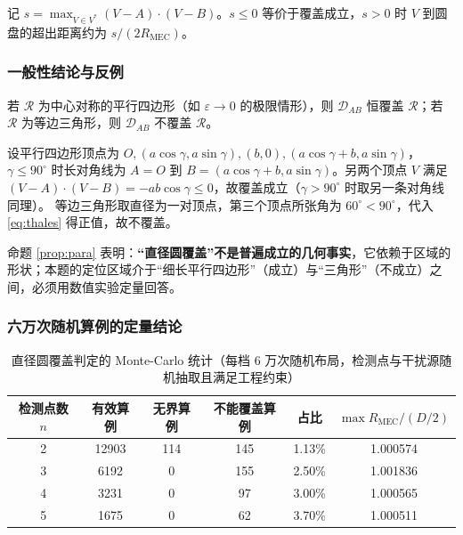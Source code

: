 记 $s=\max_{V\in V^*}(V-A)\cdot(V-B)$。$s\le0$ 等价于覆盖成立，$s>0$ 时 $V$ 到圆盘的超出距离约为 $s/(2R_{\mathrm{MEC}})$。

\subsubsection{一般性结论与反例}

\begin{proposition}\label{prop:para}
若 $\mathcal R$ 为中心对称的平行四边形（如 $\varepsilon\to0$ 的极限情形），则 $\mathcal D_{AB}$ 恒覆盖 $\mathcal R$；若 $\mathcal R$ 为等边三角形，则 $\mathcal D_{AB}$ 不覆盖 $\mathcal R$。
\end{proposition}
\begin{pf}
设平行四边形顶点为 $O,(a\cos\gamma,a\sin\gamma),(b,0),(a\cos\gamma+b,a\sin\gamma)$，$\gamma\le90^{\circ}$ 时长对角线为 $A=O$ 到 $B=(a\cos\gamma+b,a\sin\gamma)$。另两个顶点 $V$ 满足 $(V-A)\cdot(V-B)=-ab\cos\gamma\le0$，故覆盖成立（$\gamma>90^{\circ}$ 时取另一条对角线同理）。
等边三角形取直径为一对顶点，第三个顶点所张角为 $60^{\circ}<90^{\circ}$，代入 \eqref{eq:thales} 得正值，故不覆盖。
\end{pf}

命题 \ref{prop:para} 表明：\textbf{“直径圆覆盖”不是普遍成立的几何事实}，它依赖于区域的形状；本题的定位区域介于“细长平行四边形”（成立）与“三角形”（不成立）之间，必须用数值实验定量回答。

\subsubsection{六万次随机算例的定量结论}

\begin{table}[H]
\centering
\caption{直径圆覆盖判定的 Monte-Carlo 统计（每档 6 万次随机布局，检测点与干扰源随机抽取且满足工程约束）}
\label{tab:q1cover}
\begin{tabular}{cccccc}
\toprule
检测点数 $n$ & 有效算例 & 无界算例 & 不能覆盖算例 & 占比 & $\max R_{\mathrm{MEC}}/(D/2)$\\
\midrule
2 & 12903 & 114 & 145 & 1.13\% & 1.000574\\
3 & 6192  & 0   & 155 & 2.50\% & 1.001836\\
4 & 3231  & 0   & 97  & 3.00\% & 1.000565\\
5 & 1675  & 0   & 62  & 3.70\% & 1.000511\\
\bottomrule
\end{tabular}
\end{table}

